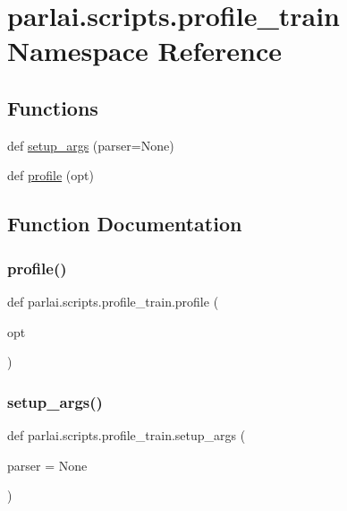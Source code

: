 \hypertarget{namespaceparlai_1_1scripts_1_1profile__train}{}\section{parlai.\+scripts.\+profile\+\_\+train Namespace Reference}
\label{namespaceparlai_1_1scripts_1_1profile__train}
\subsection*{Functions}
\begin{DoxyCompactItemize}
\item 
def \hyperlink{namespaceparlai_1_1scripts_1_1profile__train_abc73daf8a16d21ce56906342ec15cda9}{setup\+\_\+args} (parser=None)
\item 
def \hyperlink{namespaceparlai_1_1scripts_1_1profile__train_a72ecdcc9932f8566d611093a2daeaa2a}{profile} (opt)
\end{DoxyCompactItemize}


\subsection{Function Documentation}
\mbox{\label{namespaceparlai_1_1scripts_1_1profile__train_a72ecdcc9932f8566d611093a2daeaa2a}} 
\subsubsection{\texorpdfstring{profile()}{profile()}}
{\footnotesize\ttfamily def parlai.\+scripts.\+profile\+\_\+train.\+profile (\begin{DoxyParamCaption}\item[{}]{opt }\end{DoxyParamCaption})}

\mbox{\label{namespaceparlai_1_1scripts_1_1profile__train_abc73daf8a16d21ce56906342ec15cda9}} 
\subsubsection{\texorpdfstring{setup\+\_\+args()}{setup\_args()}}
{\footnotesize\ttfamily def parlai.\+scripts.\+profile\+\_\+train.\+setup\+\_\+args (\begin{DoxyParamCaption}\item[{}]{parser = {\ttfamily None} }\end{DoxyParamCaption})}


